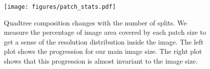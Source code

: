 \begin{figure}[t!]
  \centering
  \hspace*{-0.035\linewidth}
  \texttt{[image: figures/patch\_stats.pdf]}
  \caption{Quadtree composition changes with the number of splits. We measure the percentage of image area covered by each patch size to get a sense of the resolution distribution inside the image. The left plot shows the progression for our main image size. The right plot shows that this progression is almost invariant to the image size.}
  \label{figure:patch_stats}
\end{figure}
